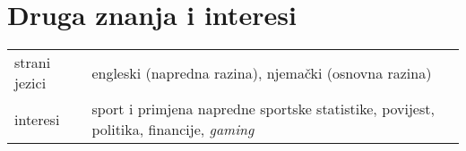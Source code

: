 \documentclass[a4paper]{article}
\makeatletter
\newlength{\tablewidth}
\newenvironment{skills}{%
\setlength{\tablewidth}{\linewidth}
\addtolength{\tablewidth}{-2\tabcolsep}
\begin{tabular}{@{}p{0.15\tablewidth}p{0.85\tablewidth}@{}}
}{%
\end{tabular}
}
\makeatother
\begin{document}

\section{Druga znanja i interesi}
\begin{skills}
	strani jezici & engleski (napredna razina), njemački (osnovna razina) \\
	interesi & sport i primjena napredne sportske statistike, povijest, politika, financije, \textit{gaming}\\
\end{skills}
\end{document}
